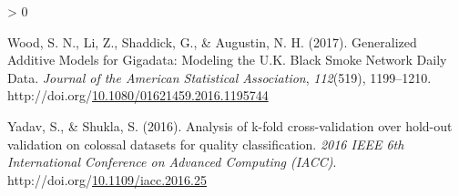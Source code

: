\documentclass[12pt,oneside]{reedthesis}
\newlength{\cslhangindent}
\newenvironment{CSLReferences}[2] %
 {%
  \setlength{\parindent}{0pt}
  \ifodd #1 \everypar{\setlength{\hangindent}{\cslhangindent}}\ignorespaces\fi
  \ifnum #2 > 0
  \setlength{\parskip}{#2\baselineskip}
  \fi
 }%
 {}
\begin{document}
\begin{CSLReferences}{1}{0}
\leavevmode\hypertarget{ref-wood2017}{}%
Wood, S. N., Li, Z., Shaddick, G., \& Augustin, N. H. (2017). Generalized Additive Models for Gigadata: Modeling the U.K. Black Smoke Network Daily Data. \emph{Journal of the American Statistical Association}, \emph{112}(519), 1199--1210. http://doi.org/\href{https://doi.org/10.1080/01621459.2016.1195744}{10.1080/01621459.2016.1195744}

\leavevmode\hypertarget{ref-yadav2016}{}%
Yadav, S., \& Shukla, S. (2016). Analysis of k-fold cross-validation over hold-out validation on colossal datasets for quality classification. \emph{2016 IEEE 6th International Conference on Advanced Computing (IACC)}. http://doi.org/\href{https://doi.org/10.1109/iacc.2016.25}{10.1109/iacc.2016.25}

\end{CSLReferences}

\end{document}
